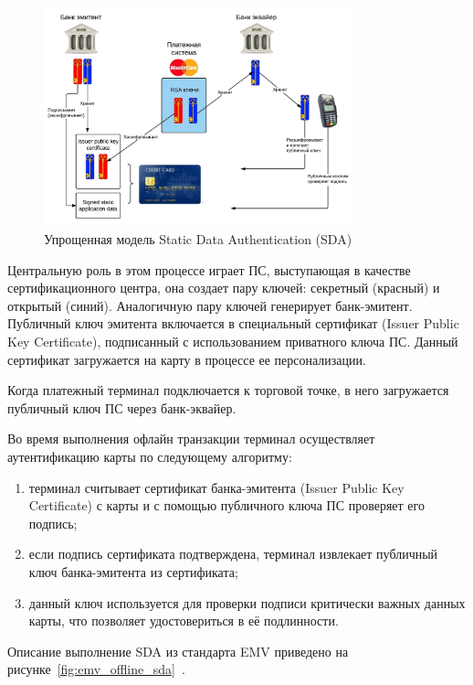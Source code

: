 \begin{figure}[H]
    \centering
    \includegraphics[width=0.8\textwidth]{images/research/sda}
    \caption{\centering Упрощенная модель Static Data Authentication (SDA)}
    \label{fig:sda}
\end{figure}

Центральную роль в этом процессе играет ПС, выступающая в качестве сертификационного центра, она создает пару ключей: секретный (красный) и открытый (синий).
Аналогичную пару ключей генерирует банк-эмитент.
Публичный ключ эмитента включается в специальный сертификат (Issuer Public Key Certificate), подписанный с использованием приватного ключа ПС.
Данный сертификат загружается на карту в процессе ее персонализации.

Когда платежный терминал подключается к торговой точке, в него загружается публичный ключ ПС через банк-эквайер.

Во время выполнения офлайн транзакции терминал осуществляет аутентификацию карты по следующему алгоритму:

\begin{enumerate}
    \item терминал считывает сертификат банка-эмитента (Issuer Public Key Certificate) с карты и с помощью публичного ключа ПС проверяет его подпись;
    \item если подпись сертификата подтверждена, терминал извлекает публичный ключ банка-эмитента из сертификата;
    \item данный ключ используется для проверки подписи критически важных данных карты, что позволяет удостовериться в её подлинности.
\end{enumerate}


Описание выполнение SDA из стандарта EMV приведено на рисунке~\ref{fig:emv_offline_sda}~\cite{emv_book_2}.

